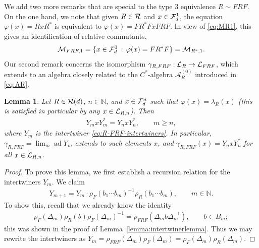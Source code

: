 \documentclass[12pt,a4paper]{amsart}
\numberwithin{equation}{section}
\newtheorem{lemma}[theorem]{Lemma}
\theoremstyle{remark}
\DeclareMathOperator{\ad}{ad}
\newcommand{\Nl}{\mathbb{N}}
\newcommand{\la}{\lambda}
\newcommand{\CA}[0]{\mathcal{A}} \newcommand{\CB}[0]{\mathcal{B}}
\newcommand{\CM}[0]{\mathcal{M}} \newcommand{\CN}[0]{\mathcal{N}}
\begin{document}
\begin{description}
	We add two more remarks that are special to the type 3 equivalence $R\sim FRF$. On the one hand, we note that given $R\in\mathcal{R}$ and $x\in\mathcal{F}_d^1$, the equation $\varphi(x)=RxR^*$ is equivalent to $\varphi(x)=FR^*FxFRF$. In view of \eqref{eq:MR1}, this gives an identification of relative commutants,
	\begin{align}
		\CM_{FRF,1}=\{x\in\CF_d^1\,:\,\varphi(x)=FR^*F\}=\CM_{R^*,1}.
	\end{align}
	Our second remark concerns the isomorphism $\gamma_{R,FRF}:\mathcal{L}_R\to\mathcal{L}_{FRF}$, which extends to an algebra closely related to the $C^*$-algebra $\CA_R^{(0)}$ introduced in \eqref{eq:AR}.
	
	\begin{lemma}\label{lemma:R-FRF}
		Let $R\in\mathcal{R}(d)$, $n\in\Nl$, and $x\in\mathcal{F}_d^n$ such that $\varphi(x)=\la_R(x)$ (this is satisfied in particular by any $x\in\mathcal{L}_{R,n}$). Then
		\begin{align}
			Y_mxY_m^*=Y_nxY_n^*,\qquad m\geq n,
		\end{align}
		where $Y_m$ is the intertwiner \eqref{eq:R-FRF-intertwiners}. In particular, $\gamma_{R,FRF}=\lim_m \ad Y_m$ extends to such elements $x$, and $\gamma_{R,FRF}(x)=Y_nxY_n^*$ for all $x\in\mathcal{L}_{R,n}$.
	\end{lemma}
	\begin{proof}
		To prove this lemma, we first establish a recursion relation for the intertwiners $Y_m$. We claim
		\begin{align}\label{eq:Ym-recursion}
			Y_{m+1}
			=
			Y_m\cdot\rho_F(b_1\cdots b_m)^{-1}\rho_R(b_1\cdots b_m),\qquad m\in\Nl.
		\end{align}
		To show this, recall that we already know the identity 
		\begin{align*}
            \rho_F(\Delta_m)\rho_R(b)\rho_F(\Delta_m)^{-1}
            =
            \rho_{FRF}(\Delta_m b\Delta_m^{-1}), \qquad b\in B_m;
        \end{align*}
		this was shown in the proof of Lemma~\ref{lemma:intertwinerlemma}. Thus we may rewrite the intertwiners as $Y_m=\rho_{FRF}(\Delta_m)\rho_F(\Delta_m)=\rho_F(\Delta_m)\rho_R(\Delta_m)$. 
		

\end{proof}
\end{description}
\end{document}
